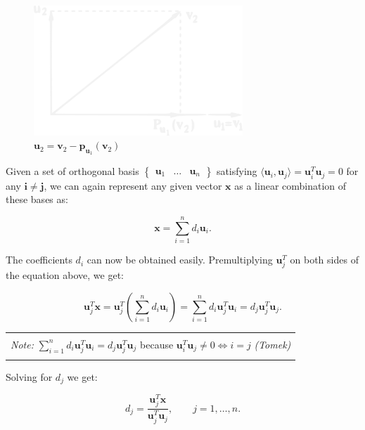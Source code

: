 \documentclass[10pt,b5paper,titlepage]{book}
\newenvironment{bbox}[1][1.0]
{
    \begin{center}
        \begin{tabular}{|p{#1\textwidth}|}
            \hline\\
}
{
            \\\\\hline
        \end{tabular}
    \end{center}
}
\begin{document}
\begin{figure}[h]
    \centering
    \includegraphics[width=0.7\textwidth]{./img/GramSchmidt_inv}
    \caption{$\mathbf{u}_{2} = \mathbf{v}_{2} - \mathbf{p}_{\mathbf{u}_{1}}(\mathbf{v}_{2})$}
    \label{fig:GramSchmidt}
\end{figure}

Given a set of orthogonal basis $\begin{Bmatrix} \mathbf{u}_1 & \ldots & \mathbf{u}_n \end{Bmatrix}$
satisfying $\langle \mathbf{u}_{i}, \mathbf{u}_{j} \rangle = \mathbf{u}_{i}^{T}\mathbf{u}_{j} = 0$
for any $\mathbf{i \neq j}$, we can again represent any given vector $\mathbf{x}$
as a linear combination of these bases as:

\begin{equation}
    \mathbf{x} = \sum_{i=1}^{n} d_{i} \mathbf{u}_{i}
.\end{equation}

The coefficients $d_{i}$ can now be obtained easily. Premultiplying
$\mathbf{u}_{j}^{T}$ on both sides of the equation above, we get:

\begin{equation}
    \mathbf{u}_{j}^{T} \mathbf{x}
    = \mathbf{u}_{j}^{T} \left(
    \sum_{i=1}^{n} d_{i} \mathbf{u}_{i}\right)
    = \sum_{i=1}^{n} d_{i} \mathbf{u}_{j}^{T} \mathbf{u}_{i}
    = d_{j} \mathbf{u}_{j}^{T} \mathbf{u}_{j}
.\end{equation}

\begin{bbox}[1.0]
\textit{Note:}
    $\sum_{i=1}^{n} d_{i} \mathbf{u}_{j}^{T} \mathbf{u}_{i} = d_{j} \mathbf{u}_{j}^{T} \mathbf{u}_{j}$
    because $\mathbf{u}_{i}^{T} \mathbf{u}_{j} \neq 0 \iff i = j$ \textit{(Tomek)}
\end{bbox}

Solving for $d_{j}$ we get:

\begin{equation}
    d_{j} = \frac{\mathbf{u}_{j}^{T}\mathbf{x}}{\mathbf{u}_{j}^{T}\mathbf{u}_{j}},
    \qquad j = 1, \ldots, n
.\end{equation}
\end{document}
